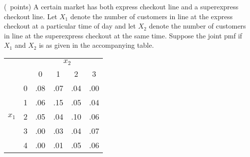 \begin{questions}
   \question (\totalpoints\ points) A certain market has both express
   checkout line and a superexpress checkout line. Let $X_1$ denote
   the number of customers in line at the express checkout at a
   particular time of day and let $X_2$ denote the number of customers
   in line at the superexpress checkout at the same time. Suppose the
   joint pmf if $X_1$ and $X_2$ is as given in the accompanying table.

   \begin{center}
   \begin{tabular}{lc|cccc}
        & & \multicolumn{4}{c}{$x_2$} \\
        & & 0 & 1 & 2 & 3 \\
        \hline
        & 0 & .08 & .07 & .04 & .00 \\       
        & 1 & .06 & .15 & .05 & .04 \\
  $x_1$ & 2 & .05 & .04 & .10 & .06 \\
        & 3 & .00 & .03 & .04 & .07 \\
        & 4 & .00 & .01 & .05 & .06 
   \end{tabular}
   \end{center}

\end{questions}

